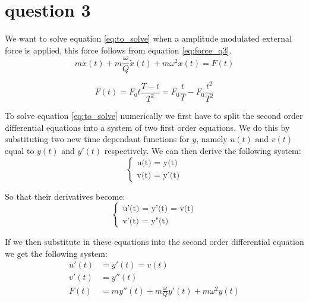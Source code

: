 \section{question 3}
We want to solve equation \ref{eq:to_solve} when a amplitude modulated external force is applied, this force follows from equation \ref{eq:force_q3}.\\

\begin{equation}
    m \ddot{x}(t)+m\frac{\omega}{Q}\dot{x}(t)+m \omega^2 x(t) = F(t)
    \label{eq:to_solve}
\end{equation}

\begin{equation}
    F(t) = F_0 t\frac{T-t}{T^2}= F_0 \frac{t}{T} - F_0 \frac{t^2}{T^2}
    \label{eq:force_q3}
\end{equation}

To solve equation \ref{eq:to_solve} numerically we first have to split the second order differential equations into a system of two first order equations. We do this by substituting two new time dependant functions for $y$, namely $u(t)$ and $v(t)$ equal to $y(t)$ and $y'(t)$ respectively. We can then derive the following system:\\

\begin{equation*}
    \left\{ \begin{matrix} \mbox{u(t) = y(t)}\\
    \mbox{v(t) = y'(t)} \end{matrix} \right.
\end{equation*}

So that their derivatives become:\\

\begin{equation*}
    \left\{ \begin{matrix} \mbox{u'(t) = y'(t) = v(t)}\\
    \mbox{v'(t) = y"(t)} \end{matrix} \right.
\end{equation*}

If we then substitute in these equations into the second order differential equation we get the following system:\\

\begin{align*}
    u'(t) &= y'(t) = v(t)\\
    v'(t) &= y''(t)\\
    F(t) &= m y''(t)+m\frac{\omega}{Q}y'(t)+m \omega^2 y(t)\\
\end{align*}


